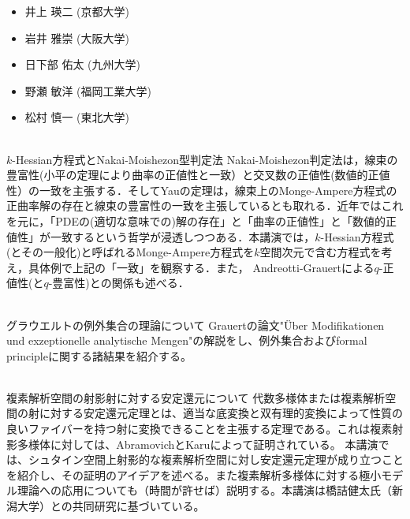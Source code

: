\documentclass[dvipdfmx,a4paper,12pt]{article}
\theoremstyle{plain} %
\theoremstyle{definition} %
\begin{document}
  \vskip5mm
  
\begin{itemize}
  \setlength{\parskip}{0cm} 
  \setlength{\itemsep}{0cm}
\item 井上 瑛二 (京都大学)
\item 岩井 雅崇 (大阪大学)
\item 日下部 佑太 (九州大学)
\item 野瀬 敏洋 (福岡工業大学)
\item 松村 慎一 (東北大学)
  \end{itemize}


\newpage

\vskip5mm

\vskip5mm
\\
$k$-Hessian方程式とNakai-Moishezon型判定法
\vskip3mm
Nakai-Moishezon判定法は，線束の豊富性(小平の定理により曲率の正値性と一致）と交叉数の正値性(数値的正値性）の一致を主張する．そしてYauの定理は，線束上のMonge-Ampere方程式の正曲率解の存在と線束の豊富性の一致を主張しているとも取れる．近年ではこれを元に，「PDEの(適切な意味での)解の存在」と「曲率の正値性」と「数値的正値性」が一致するという哲学が浸透しつつある．本講演では，$k$-Hessian方程式(とその一般化)と呼ばれるMonge-Ampere方程式を$k$空間次元で含む方程式を考え，具体例で上記の「一致」を観察する．また， Andreotti-Grauertによる$q$-正値性(と$q$-豊富性)との関係も述べる．
\vskip8mm

\\
グラウエルトの例外集合の理論について 
\vskip3mm
Grauertの論文"\"Uber Modifikationen und exzeptionelle analytische Mengen"の解説をし、例外集合およびformal principleに関する諸結果を紹介する。 
\vskip8mm

\\
複素解析空間の射影射に対する安定還元について
\vskip3mm
代数多様体または複素解析空間の射に対する安定還元定理とは、適当な底変換と双有理的変換によって性質の良いファイバーを持つ射に変換できることを主張する定理である。これは複素射影多様体に対しては、AbramovichとKaruによって証明されている。
本講演では、シュタイン空間上射影的な複素解析空間に対し安定還元定理が成り立つことを紹介し、その証明のアイデアを述べる。また複素解析多様体に対する極小モデル理論への応用についても（時間が許せば）説明する。本講演は橋詰健太氏（新潟大学）との共同研究に基づいている。
\vskip5mm

\newpage
\end{document}
